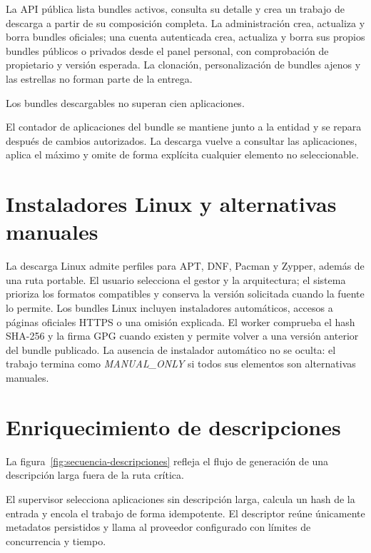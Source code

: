 
La API pública lista bundles activos, consulta su detalle y crea un trabajo de descarga a partir de su composición completa. La administración crea, actualiza y borra bundles oficiales; una cuenta autenticada crea, actualiza y borra sus propios bundles públicos o privados desde el panel personal, con comprobación de propietario y versión esperada. La clonación, personalización de bundles ajenos y las estrellas no forman parte de la entrega.

Los bundles descargables no superan cien aplicaciones.

El contador de aplicaciones del bundle se mantiene junto a la entidad y se repara después de cambios autorizados. La descarga vuelve a consultar las aplicaciones, aplica el máximo y omite de forma explícita cualquier elemento no seleccionable.

\section{Instaladores Linux y alternativas manuales}

La descarga Linux admite perfiles para APT, DNF, Pacman y Zypper, además de una ruta portable. El usuario selecciona el gestor y la arquitectura; el sistema prioriza los formatos compatibles y conserva la versión solicitada cuando la fuente lo permite. Los bundles Linux incluyen instaladores automáticos, accesos  a páginas oficiales HTTPS o una omisión explicada. El worker comprueba el hash SHA-256 y la firma GPG cuando existen y permite volver a una versión anterior del bundle publicado. La ausencia de instalador automático no se oculta: el trabajo termina como \emph{MANUAL\_ONLY} si todos sus elementos son alternativas manuales.

\section{Enriquecimiento de descripciones}

La figura~\ref{fig:secuencia-descripciones} refleja el flujo de generación de una descripción larga fuera de la ruta crítica.


El supervisor selecciona aplicaciones sin descripción larga, calcula un hash de la entrada y encola el trabajo de forma idempotente. El descriptor reúne únicamente metadatos persistidos y llama al proveedor configurado con límites de concurrencia y tiempo.

